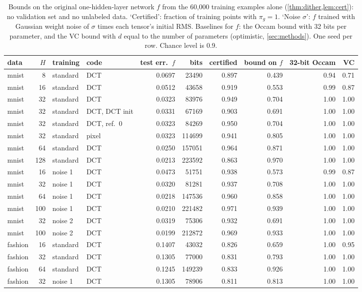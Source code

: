 \begin{table}[t]
\centering\small
\begin{adjustbox}{max width=\linewidth}\begin{tabular}{l r l l r r r r r r}
\toprule
data & $H$ & training & code & test err.\ $f$ & bits & certified & bound on $f$ & 32-bit Occam & VC \\
\midrule
mnist & 8 & standard & DCT & 0.0697 & 23490 & 0.897 & 0.439 & 0.94 & 0.71 \\
mnist & 16 & standard & DCT & 0.0512 & 43658 & 0.919 & 0.553 & 0.99 & 0.87 \\
mnist & 32 & standard & DCT & 0.0323 & 83976 & 0.949 & 0.704 & 1.00 & 1.00 \\
mnist & 32 & standard & DCT, DCT init & 0.0331 & 67169 & 0.903 & 0.691 & 1.00 & 1.00 \\
mnist & 32 & standard & DCT, ref.\ 0 & 0.0323 & 84269 & 0.950 & 0.704 & 1.00 & 1.00 \\
mnist & 32 & standard & pixel & 0.0323 & 114699 & 0.941 & 0.805 & 1.00 & 1.00 \\
mnist & 64 & standard & DCT & 0.0250 & 157051 & 0.964 & 0.871 & 1.00 & 1.00 \\
mnist & 128 & standard & DCT & 0.0213 & 223592 & 0.863 & 0.970 & 1.00 & 1.00 \\
mnist & 16 & noise 1 & DCT & 0.0473 & 51751 & 0.938 & 0.573 & 0.99 & 0.87 \\
mnist & 32 & noise 1 & DCT & 0.0320 & 81281 & 0.937 & 0.708 & 1.00 & 1.00 \\
mnist & 64 & noise 1 & DCT & 0.0218 & 147536 & 0.960 & 0.858 & 1.00 & 1.00 \\
mnist & 100 & noise 1 & DCT & 0.0210 & 221482 & 0.971 & 0.939 & 1.00 & 1.00 \\
mnist & 32 & noise 2 & DCT & 0.0319 & 75306 & 0.932 & 0.691 & 1.00 & 1.00 \\
mnist & 100 & noise 2 & DCT & 0.0199 & 212872 & 0.969 & 0.933 & 1.00 & 1.00 \\
fashion & 16 & standard & DCT & 0.1407 & 43032 & 0.826 & 0.659 & 1.00 & 0.95 \\
fashion & 32 & standard & DCT & 0.1305 & 77000 & 0.831 & 0.793 & 1.00 & 1.00 \\
fashion & 64 & standard & DCT & 0.1245 & 149239 & 0.833 & 0.926 & 1.00 & 1.00 \\
fashion & 32 & noise 1 & DCT & 0.1305 & 78906 & 0.811 & 0.813 & 1.00 & 1.00 \\
\bottomrule
\end{tabular}\end{adjustbox}
\caption{Bounds on the original one-hidden-layer network $f$ from the 60{,}000 training examples alone (\cref{thm:dither,lem:cert}): no validation set and no unlabeled data. `Certified': fraction of training points with $\pi_g=1$. `Noise $\sigma$': $f$ trained with Gaussian weight noise of $\sigma$ times each tensor's initial RMS. Baselines for $f$: the Occam bound with 32 bits per parameter, and the VC bound with $d$ equal to the number of parameters (optimistic, \cref{sec:methods}). One seed per row. Chance level is 0.9.}\label{tab:t3}
\end{table}
